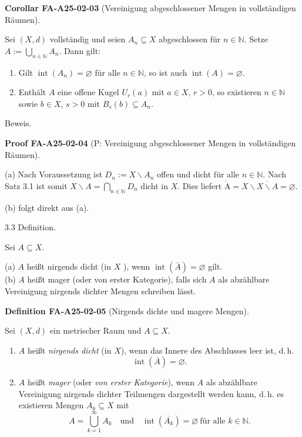 \documentclass[10pt, letterpaper]{article}
\newcommand{\CustomHeading}[3]{%
  \par\medskip\noindent%
  \textbf{#1 #2} \textnormal{(#3)}.\enskip%
}
\newenvironment{DEF}[2]{\begin{unitbox}\CustomHeading{Definition}{#1}{#2}}{\end{unitbox}}
\newenvironment{KORO}[2]{\begin{unitbox}\CustomHeading{Corollar}{#1}{#2}}{\end{unitbox}}
\newenvironment{PROOF}[2]{\begin{unitbox}\CustomHeading{Proof}{#1}{#2}}{\end{unitbox}}
\def\AA{\mathring{\mathrm{A}}}
\begin{document}
\begin{KORO}{FA-A25-02-03}{Vereinigung abgeschlossener Mengen in vollständigen Räumen}
Sei $(X,d)$ vollständig und seien $A_n\subseteq X$ abgeschlossen für $n\in\mathbb{N}$. Setze $A:=\bigcup_{n\in\mathbb{N}}A_n$. Dann gilt:
\begin{enumerate}\itemsep0.2em
\item[(a)] Gilt $\operatorname{int}(A_n)=\varnothing$ für alle $n\in\mathbb{N}$, so ist auch $\operatorname{int}(A)=\varnothing$.
\item[(b)] Enthält $A$ eine offene Kugel $U_r(a)$ mit $a\in X$, $r>0$, so existieren $n\in\mathbb{N}$ sowie $b\in X$, $s>0$ mit $B_s(b)\subseteq A_n$.
\end{enumerate}
\end{KORO}


Beweis. 

\begin{PROOF}{FA-A25-02-04}{P: Vereinigung abgeschlossener Mengen in vollständigen Räumen}
(a) Nach Voraussetzung ist $D_{n}:=X \backslash A_{n}$ offen und dicht für alle $n \in \mathbb{N}$. Nach Satz 3.1 ist somit $X \backslash A=\bigcap_{n \in \mathbb{N}} D_{n}$ dicht in $X$. Dies liefert $\AA=X \backslash \overline{X \backslash A}=\varnothing$.

(b) folgt direkt aus (a).
\end{PROOF}


3.3 Definition. 

Sei $A \subseteq X$.

(a) $A$ heißt nirgends dicht (in $X$ ), wenn $\operatorname{int}(\bar{A})=\varnothing$ gilt.\\
(b) $A$ heißt mager (oder von erster Kategorie), falls sich $A$ als abzählbare Vereinigung nirgends dichter Mengen schreiben lässt.



\begin{DEF}{FA-A25-02-05}{Nirgends dichte und magere Mengen}
Sei $(X,d)$ ein metrischer Raum und $A\subseteq X$.
\begin{enumerate}\itemsep0.2em
\item[(a)] $A$ heißt \emph{nirgends dicht} (in $X$), wenn das Innere des Abschlusses leer ist, d.\,h.
\[
\operatorname{int}(\overline{A})=\varnothing.
\]
\item[(b)] $A$ heißt \emph{mager} (oder \emph{von erster Kategorie}), wenn $A$ als abzählbare Vereinigung nirgends dichter Teilmengen dargestellt werden kann, d.\,h. es existieren Mengen $A_k\subseteq X$ mit
\[
A=\bigcup_{k=1}^{\infty} A_k
\quad\text{und}\quad
\operatorname{int}(\overline{A_k})=\varnothing\ \text{für alle }k\in\mathbb{N}.
\]
\end{enumerate}
\end{DEF}
\end{document}
